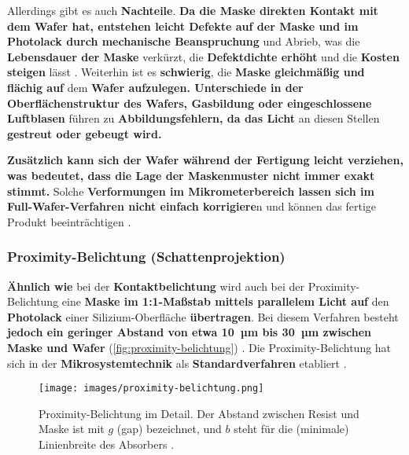 \documentclass{article} %
\begin{document}
\vspace{1em}

Allerdings gibt es auch \textbf{Nachteile}. \textbf{Da die Maske direkten Kontakt mit dem Wafer hat, entstehen leicht Defekte auf der Maske und im Photolack durch mechanische Beanspruchung} und Abrieb, was die \textbf{Lebensdauer der Maske} verkürzt, die \textbf{Defektdichte erhöht} und die \textbf{Kosten steigen} lässt \cite{schmid2024}. Weiterhin ist es \textbf{schwierig}, die \textbf{Maske gleichmäßig und flächig auf} dem \textbf{Wafer aufzulegen. Unterschiede in der Oberflächenstruktur des Wafers, Gasbildung oder eingeschlossene Luftblasen} führen zu \textbf{Abbildungsfehlern, da das Licht} an diesen Stellen \textbf{gestreut oder gebeugt wird.}

\vspace{1em}

\textbf{Zusätzlich kann sich der Wafer während der Fertigung leicht verziehen, was bedeutet, dass die Lage der Maskenmuster nicht immer exakt stimmt.} Solche \textbf{Verformungen im Mikrometerbereich lassen sich im Full-Wafer-Verfahren nicht einfach korrigiere}n und können das fertige Produkt beeinträchtigen \cite{schmid2024}.





\vspace{1em}

\subsubsection{Proximity-Belichtung (Schattenprojektion)}

\textbf{Ähnlich wie} bei der \textbf{Kontaktbelichtung} wird auch bei der Proximity-Belichtung eine \textbf{Maske im 1:1-Maßstab mittels parallelem Licht auf} den \textbf{Photolack} einer Silizium-Oberfläche \textbf{übertragen}. Bei diesem Verfahren besteht \textbf{jedoch ein geringer Abstand von etwa 10~µm bis 30~µm zwischen Maske und Wafer} (\autoref{fig:proximity-belichtung}) \cite{Mescheder2004}. Die Proximity-Belichtung hat sich in der \textbf{Mikrosystemtechnik} als \textbf{Standardverfahren} etabliert \cite{schmid2024}.

\begin{figure}[htb!]
    \centering
    \texttt{[image: images/proximity-belichtung.png]} %
    \captionsetup{labelfont=bf, width=.5\textwidth} %
    \caption{Proximity-Belichtung im Detail. Der Abstand zwischen Resist und Maske ist mit \( g \) (gap) bezeichnet, und \( b \) steht für die (minimale) Linienbreite des Absorbers \cite{schmid2024}.}
    \label{fig:proximity-belichtung}
\end{figure}
\end{document}
